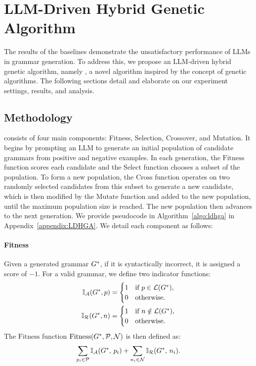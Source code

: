 \section{LLM-Driven Hybrid Genetic Algorithm}
\label{sec:ldhm_ga}
The results of the baselines demonstrate the unsatisfactory performance of LLMs in grammar generation. To address this, we propose an LLM-driven hybrid genetic algorithm, namely \NAME, a novel algorithm inspired by the concept of genetic algorithms. The following sections detail \NAME and elaborate on our experiment settings, results, and analysis.

\subsection{Methodology}
\NAME consists of four main components: Fitness, Selection, Crossover, and Mutation. It begins by prompting an LLM to generate an initial population of candidate grammars from positive and negative examples. In each generation, the $\mathrm{Fitness}$ function scores each candidate and the $\mathrm{Select}$ function chooses a subset of the population. To form a new population, the $\mathrm{Cross}$ function operates on two randomly selected candidates from this subset to generate a new candidate, which is then modified by the $\mathrm{Mutate}$ function and added to the new population, until the maximum population size is reached. The new population then advances to the next generation. We provide pseudocode in Algorithm~\ref{algo:ldhga} in Appendix~\ref{appendix:LDHGA}. We detail each component as follows:

\paragraph{Fitness}
Given a generated grammar $G^*$, if it is syntactically incorrect, it is assigned a score of $-1$. 
For a valid grammar, we define two indicator functions:
\begin{align*}
\mathbb{I}_{\mathcal{A}}(G^*, p) &=
\begin{cases}
1 & \text{if } p \in \mathcal{L}(G^*),\\
0 & \text{otherwise}.
\end{cases}\\
\mathbb{I}_{\mathcal{R}}(G^*, n) &=
\begin{cases}
1 & \text{if } n \notin \mathcal{L}(G^*),\\
0 & \text{otherwise}.
\end{cases}
\end{align*}
The $\mathrm{Fitness}$ function $\mathrm{Fitness}(G^*,\mathcal{P},\mathcal{N})$ is then defined as: 
\[
\sum_{p_i\in \mathcal{P}} 
\mathbb{I}_{\mathcal{A}}(G^*,\,p_i) 
+ \sum_{n_i \in \mathcal{N}} 
\mathbb{I}_{\mathcal{R}}(G^*,\,n_i). 
\]

